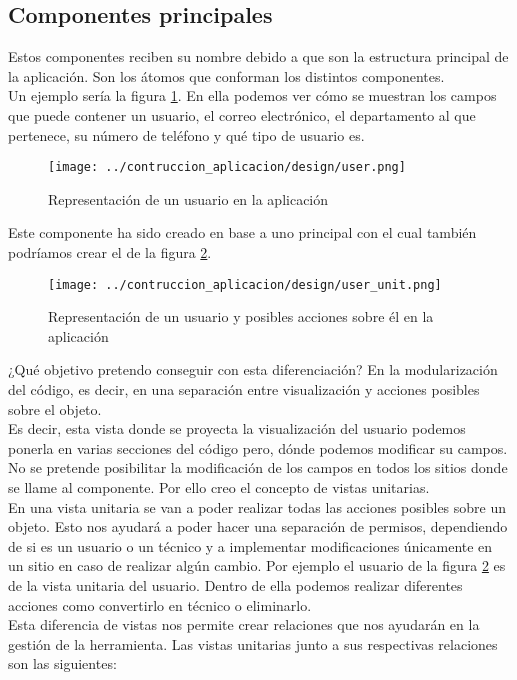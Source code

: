 \subsection{Componentes principales}
Estos componentes reciben su nombre debido a que son la estructura principal de la aplicación. Son los átomos que conforman los distintos componentes.
\\Un ejemplo sería la figura \ref{fig:user-view}. En ella podemos ver cómo se muestran los campos que puede contener un usuario, el correo electrónico, el departamento al que pertenece, su número de teléfono y qué tipo de usuario es.
\begin{figure}[h]
    \centering
    \texttt{[image: ../contruccion\_aplicacion/design/user.png]}
    \caption{Representación de un usuario en la aplicación}\label{fig:user-view}
\end{figure}
Este componente ha sido creado en base a uno principal con el cual también podríamos crear el de la figura \ref{fig:user-unit}.
\begin{figure}[h]
    \centering
    \texttt{[image: ../contruccion\_aplicacion/design/user\_unit.png]}
    \caption{Representación de un usuario y posibles acciones sobre él en la aplicación}\label{fig:user-unit}
\end{figure}
¿Qué objetivo pretendo conseguir con esta diferenciación? En la modularización del código, es decir, en una separación entre visualización y acciones posibles sobre el objeto.
\\Es decir, esta vista donde se proyecta la visualización del usuario podemos ponerla en varias secciones del código pero, dónde podemos modificar su campos. No se pretende posibilitar la modificación de los campos en todos los sitios donde se llame al componente. Por ello creo el concepto de vistas unitarias.
\\En una vista unitaria se van a poder realizar todas las acciones posibles sobre un objeto. Esto nos ayudará a poder hacer una separación de permisos, dependiendo de si es un usuario o un técnico y a implementar modificaciones únicamente en un sitio en caso de realizar algún cambio. Por ejemplo el usuario de la figura \ref{fig:user-unit} es de la vista unitaria del usuario. Dentro de ella podemos realizar diferentes acciones como convertirlo en técnico o eliminarlo.
\\Esta diferencia de vistas nos permite crear relaciones que nos ayudarán en la gestión de la herramienta. Las vistas unitarias junto a sus respectivas relaciones son las siguientes:

